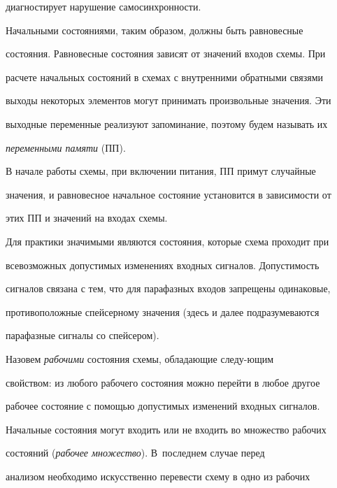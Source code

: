 диагностирует нарушение самосинх\-рон\-ности.





Начальными состояниями, таким образом, должны быть равновесные 


состояния. Равновесные состояния зависят от значений входов схемы. При 


расчете начальных состояний в схемах с внутренними обратными связями 


выходы некоторых элементов могут принимать произвольные значения. Эти 


выходные переменные реализуют запоминание, поэтому будем называть их 


\textit{переменными памяти} (ПП).





В начале работы схемы, при включении питания, ПП примут случайные 


значения, и равновесное начальное состояние установится в зависимости от 


этих ПП и значений на входах схемы.





Для практики значимыми являются состояния, которые схе\-ма проходит при 


всевозможных допустимых изменениях входных сигналов. Допустимость 


сигналов связана с тем, что для парафазных входов запрещены одинаковые, 


противоположные спейсерному значения (здесь и далее подразумеваются 


парафазные сигналы со спейсером).





Назовем \textit{рабочими} состояния схемы, обладающие следу-\linebreak ющим 


свойством: из любого рабочего состояния можно перейти в любое другое 


рабочее состояние с помощью допустимых изменений входных сигналов.





Начальные состояния могут входить или не входить во множество рабочих 


состояний (\textit{рабочее множество}). В~последнем случае перед 


анализом необходимо искусственно перевести схе\-му в одно из рабочих 


